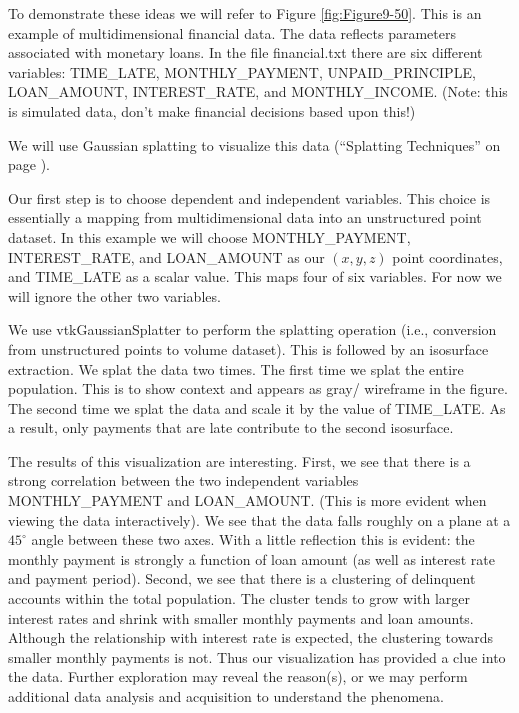 To demonstrate these ideas we will refer to Figure \ref{fig:Figure9-50}. This is an example of multidimensional financial data. The data reflects parameters associated with monetary loans. In the file financial.txt there are six different variables: TIME\_LATE, MONTHLY\_PAYMENT, UNPAID\_PRINCIPLE, LOAN\_AMOUNT, INTEREST\_RATE, and MONTHLY\_INCOME. (Note: this is simulated data, don't make financial decisions based upon this!)

We will use Gaussian splatting to visualize this data (``Splatting Techniques'' on page \pageref{subsubsec:splatting_techniques}).

Our first step is to choose dependent and independent variables. This choice is essentially a mapping from multidimensional data into an unstructured point dataset. In this example we will choose MONTHLY\_PAYMENT, INTEREST\_RATE, and LOAN\_AMOUNT as our $(x, y, z)$ point coordinates, and TIME\_LATE as a scalar value. This maps four of six variables. For now we will ignore the other two variables.

We use vtkGaussianSplatter to perform the splatting operation (i.e., conversion from unstructured points to volume dataset). This is followed by an isosurface extraction. We splat the data two times. The first time we splat the entire population. This is to show context and appears as gray/ wireframe in the figure. The second time we splat the data and scale it by the value of TIME\_LATE. As a result, only payments that are late contribute to the second isosurface.

The results of this visualization are interesting. First, we see that there is a strong correlation between the two independent variables MONTHLY\_PAYMENT and LOAN\_AMOUNT. (This is more evident when viewing the data interactively). We see that the data falls roughly on a plane at a $45^\circ$ angle between these two axes. With a little reflection this is evident: the monthly payment is strongly a function of loan amount (as well as interest rate and payment period). Second, we see that there is a clustering of delinquent accounts within the total population. The cluster tends to grow with larger interest rates and shrink with smaller monthly payments and loan amounts. Although the relationship with interest rate is expected, the clustering towards smaller monthly payments is not. Thus our visualization has provided a clue into the data. Further exploration may reveal the reason(s), or we may perform additional data analysis and acquisition to understand the phenomena.

